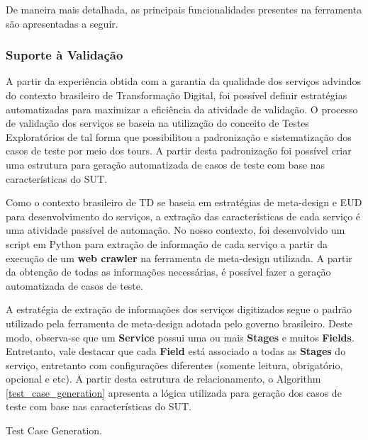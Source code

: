 De maneira mais detalhada, as principais funcionalidades presentes na ferramenta são apresentadas a seguir.

\subsubsection{Suporte à Validação}
\label{sec:teste}

A partir da experiência obtida com a garantia da qualidade dos serviços advindos do contexto brasileiro de Transformação Digital, foi possível definir estratégias automatizadas para maximizar a eficiência da atividade de validação. O processo de validação dos serviços se baseia na utilização do conceito de Testes Exploratórios de tal forma que possibilitou a padronização e sistematização dos casos de teste por meio dos tours. A partir desta padronização foi possível criar uma estrutura para geração automatizada de casos de teste com base nas características do SUT.

Como o contexto brasileiro de TD se baseia em estratégias de meta-design e EUD para desenvolvimento do serviços, a extração das características de cada serviço é uma atividade passível de automação. No nosso contexto, foi desenvolvido um script em Python para extração de informação de cada serviço a partir da execução de um \textbf{web crawler} na ferramenta de meta-design utilizada. A partir da obtenção de todas as informações necessárias, é possível fazer a geração automatizada de casos de teste.

A estratégia de extração de informações dos serviços digitizados segue o padrão utilizado pela ferramenta de meta-design adotada pelo governo brasileiro. Deste modo, observa-se que um \textbf{Service} possui uma ou mais \textbf{Stages} e muitos \textbf{Fields}. Entretanto, vale destacar que cada \textbf{Field} está associado a todas as \textbf{Stages} do serviço, entretanto com configurações diferentes (somente leitura, obrigatório, opcional e etc). A partir desta estrutura de relacionamento, o Algorithm \ref{test_case_generation} apresenta a lógica utilizada para geração dos casos de teste com base nas características do SUT.

    \begin{algorithm}[!htb]


\caption{Test Case Generation.}
\label{test_case_generation}
\end{algorithm}

